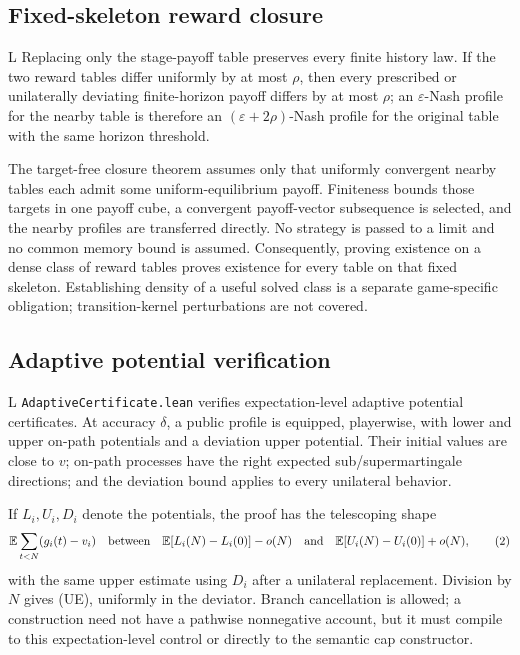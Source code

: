 \documentclass[11pt]{article}
\newcommand{\EE}{\mathbb E}
\newcommand{\LTag}{\textsf{L}}
\newcommand{\Prod}{\LTag}
\newcommand{\Status}[1]{#1}
\begin{document}
\subsection{Fixed-skeleton reward closure}

\Status{\Prod} Replacing only the stage-payoff table preserves every finite
history law.  If the two reward tables differ uniformly by at most \(\rho\),
then every prescribed or unilaterally deviating finite-horizon payoff differs
by at most \(\rho\); an \(\varepsilon\)-Nash profile for the nearby table is
therefore an \((\varepsilon+2\rho)\)-Nash profile for the original table with
the same horizon threshold.

The target-free closure theorem assumes only that uniformly convergent nearby
tables each admit some uniform-equilibrium payoff.  Finiteness bounds those
targets in one payoff cube, a convergent payoff-vector subsequence is selected,
and the nearby profiles are transferred directly.  No strategy is passed to a
limit and no common memory bound is assumed.  Consequently, proving existence
on a dense class of reward tables proves existence for every table on that
fixed skeleton.  Establishing density of a useful solved class is a separate
game-specific obligation; transition-kernel perturbations are not covered.

\subsection{Adaptive potential verification}

\Status{\Prod} \texttt{AdaptiveCertificate.lean} verifies expectation-level
adaptive potential certificates.  At accuracy \(\delta\), a public profile is
equipped, playerwise, with lower and upper on-path potentials and a deviation
upper potential.  Their initial values are close to \(v\); on-path processes
have the right expected sub/supermartingale directions; and the deviation
bound applies to every unilateral behavior.

If \(L_i,U_i,D_i\) denote the potentials, the proof has the telescoping
shape
\[
\EE\sum_{t<N}(g_i(t)-v_i)
\quad\hbox{between}\quad
\EE[L_i(N)-L_i(0)]-o(N)
\quad\hbox{and}\quad
\EE[U_i(N)-U_i(0)]+o(N),
\tag{2}
\]
with the same upper estimate using \(D_i\) after a unilateral replacement.
Division by \(N\) gives (UE), uniformly in the deviator.  Branch cancellation
is allowed; a construction need not have a pathwise nonnegative account, but
it must compile to this expectation-level control or directly to the semantic
cap constructor.
\end{document}
